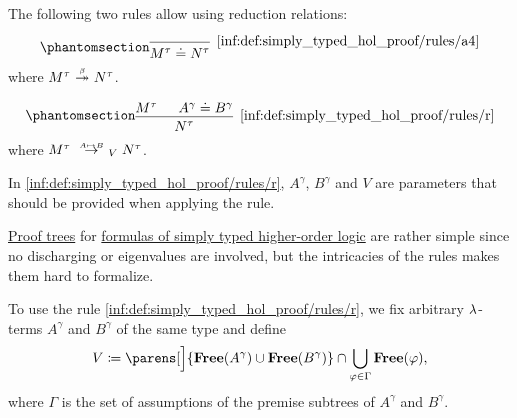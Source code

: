 \begin{definition}
\begin{thmenum}[series=def:simply_typed_hol_proof_tree]
\begin{thmenum}
       The following two rules allow using reduction relations:
      \begin{paracol}{2}
        \begin{leftcolumn}
          \ParacolAlignmentHack
          \begin{equation*}\taglabel[\ensuremath{ \logic{A}_4 }]{inf:def:simply_typed_hol_proof/rules/a4}
            \begin{prooftree}
              \infer0[\ref{inf:def:simply_typed_hol_proof/rules/a4}]{ M^\tau \syneq N^\tau },
            \end{prooftree}
          \end{equation*}
          where \( M^\tau \bred* N^\tau \).
        \end{leftcolumn}

        \begin{rightcolumn}
          \ParacolAlignmentHack
          \begin{equation*}\taglabel[\ensuremath{ \logic{R} }]{inf:def:simply_typed_hol_proof/rules/r}
            \begin{prooftree}
              \hypo{ M^\tau }
              \hypo{ A^\gamma \syneq B^\gamma }
              \infer2[\ref{inf:def:simply_typed_hol_proof/rules/r}]{ N^\tau },
            \end{prooftree}
          \end{equation*}
          where \( M^\tau \redrel{A \mapsto B}_V N^\tau \).
        \end{rightcolumn}
      \end{paracol}
    \end{thmenum}

    In \ref{inf:def:simply_typed_hol_proof/rules/r}, \( A^\gamma \), \( B^\gamma \) and \( V \) are parameters that should be provided when applying the rule.

     \hyperref[con:proof_tree]{Proof trees} for \hyperref[def:simply_typed_hol_formula]{formulas of simply typed higher-order logic} are rather simple since no discharging or eigenvalues are involved, but the intricacies of the rules makes them hard to formalize.

    To use the rule \ref{inf:def:simply_typed_hol_proof/rules/r}, we fix arbitrary \( {\mathrm \lambda} \)-terms \( A^\gamma \) and \( B^\gamma \) of the same type and define
    \begin{equation*}
      V \coloneqq \parens[\Big]{ \op*{Free}(A^\gamma) \cup \op*{Free}(B^\gamma) } \cap \bigcup_{\varphi \in \Gamma} \op*{Free}(\varphi),
    \end{equation*}
    where \( \Gamma \) is the set of assumptions of the premise subtrees of \( A^\gamma \) and \( B^\gamma \).


\end{thmenum}
\end{definition}
